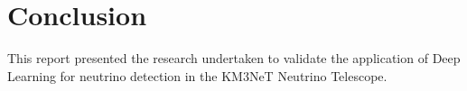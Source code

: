 
\chapter{Conclusion} %

% 

This report presented the research undertaken to validate the
application of Deep Learning for neutrino detection in the KM3NeT
Neutrino Telescope. 

